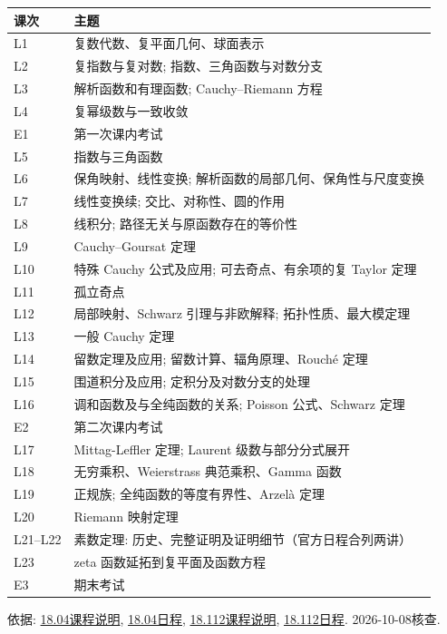 \begin{longtable}{@{}p{}p{}@{}}
\toprule 课次&主题\\\midrule\endhead
L1&复数代数、复平面几何、球面表示\\
L2&复指数与复对数; 指数、三角函数与对数分支\\
L3&解析函数和有理函数; Cauchy--Riemann 方程\\
L4&复幂级数与一致收敛\\
E1&第一次课内考试\\
L5&指数与三角函数\\
L6&保角映射、线性变换; 解析函数的局部几何、保角性与尺度变换\\
L7&线性变换续; 交比、对称性、圆的作用\\
L8&线积分; 路径无关与原函数存在的等价性\\
L9&Cauchy--Goursat 定理\\
L10&特殊 Cauchy 公式及应用; 可去奇点、有余项的复 Taylor 定理\\
L11&孤立奇点\\
L12&局部映射、Schwarz 引理与非欧解释; 拓扑性质、最大模定理\\
L13&一般 Cauchy 定理\\
L14&留数定理及应用; 留数计算、辐角原理、Rouché 定理\\
L15&围道积分及应用; 定积分及对数分支的处理\\
L16&调和函数及与全纯函数的关系; Poisson 公式、Schwarz 定理\\
E2&第二次课内考试\\
L17&Mittag-Leffler 定理; Laurent 级数与部分分式展开\\
L18&无穷乘积、Weierstrass 典范乘积、Gamma 函数\\
L19&正规族; 全纯函数的等度有界性、Arzelà 定理\\
L20&Riemann 映射定理\\
L21--L22&素数定理: 历史、完整证明及证明细节（官方日程合列两讲）\\
L23&zeta 函数延拓到复平面及函数方程\\
E3&期末考试\\\bottomrule
\end{longtable}
\noindent 依据: \href{https://ocw.mit.edu/courses/18-04-complex-variables-with-applications-spring-2018/pages/syllabus/}{18.04课程说明}, \href{https://ocw.mit.edu/courses/18-04-complex-variables-with-applications-spring-2018/pages/calendar/}{18.04日程}, \href{https://ocw.mit.edu/courses/18-112-functions-of-a-complex-variable-fall-2008/pages/syllabus/}{18.112课程说明}, \href{https://ocw.mit.edu/courses/18-112-functions-of-a-complex-variable-fall-2008/pages/calendar/}{18.112日程}. 2026-10-08核查.
